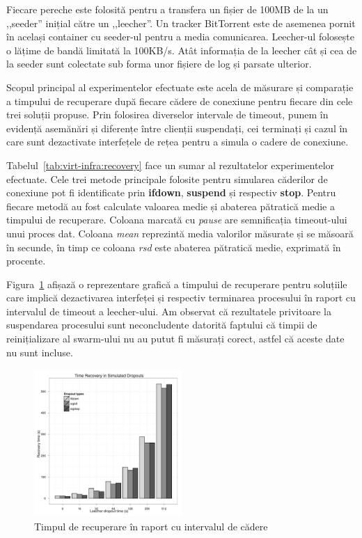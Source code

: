 Fiecare pereche este folosită pentru a transfera un fișier de 100MB
de la un ,,seeder'' inițial către un ,,leecher''. Un tracker BitTorrent
este de asemenea pornit în același container cu seeder-ul pentru a media
comunicarea. Leecher-ul folosește o lățime de bandă limitată la 100KB/s.
Atât informația de la leecher cât și cea de la seeder sunt colectate
sub forma unor fișiere de log și parsate ulterior.

Scopul principal al experimentelor efectuate este acela de măsurare și
comparație a timpului de recuperare după fiecare cădere de conexiune
pentru fiecare din cele trei soluții propuse. Prin folosirea diverselor
intervale de timeout, punem în evidență asemănări și diferențe între
clienții suspendați, cei terminați și cazul în care sunt dezactivate
interfețele de rețea pentru a simula o cadere de conexiune.



Tabelul~\ref{tab:virt-infra:recovery} face un sumar al rezultatelor
experimentelor efectuate. Cele trei metode principale folosite pentru
simularea căderilor de conexiune pot fi identificate prin \textbf{ifdown},
\textbf{suspend} și respectiv \textbf{stop}. Pentru fiecare metodă au
fost calculate valoarea medie și abaterea pătratică medie a timpului de 
recuperare. Coloana marcată cu \textit{pause} are semnificația timeout-ului
unui proces dat. Coloana \textit{mean} reprezintă media valorilor măsurate
și se măsoară în secunde, în timp ce coloana \textit{rsd} este abaterea
pătratică medie, exprimată în procente.

Figura~\ref{fig:virt-infra:time-recovery} afișază o reprezentare grafică
a timpului de recuperare pentru soluțiile care implică dezactivarea
interfeței și respectiv terminarea procesului în raport cu intervalul
de timeout a leecher-ului. Am observat că rezultatele privitoare la
suspendarea procesului sunt neconcludente datorită faptului că timpii de 
reinițializare al swarm-ului nu au putut fi măsurați corect, astfel că
aceste date nu sunt incluse.

\begin{figure}[h]
  \begin{center}
    \includegraphics[width=0.5\textwidth]{src/img/virt-infra/recovery-in-simulated-dropouts.pdf}
  \end{center}
  \caption{Timpul de recuperare în raport cu intervalul de cădere}
  \label{fig:virt-infra:time-recovery}
\end{figure}

